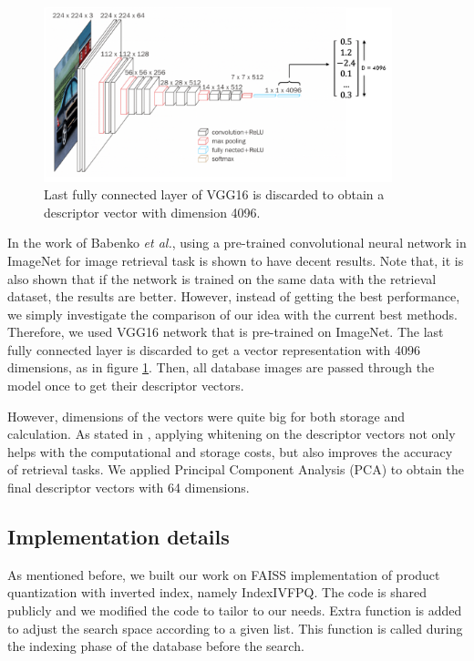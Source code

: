 \begin{figure}
    \centering
    \includegraphics[width=0.9\textwidth]{thesis/images/deep_features-fig.png}
    \caption{Last fully connected layer of VGG16\cite{simonyan2014very} is discarded to obtain a descriptor vector with dimension 4096.}
    \label{fig:vec-repr}
\end{figure}

In the work of Babenko \emph{et al.}\cite{babenko2014neural}, using a pre-trained convolutional neural network in ImageNet for image retrieval task is shown to have decent results. 
Note that, it is also shown that if the network is trained on the same data with the retrieval dataset, the results are better.
However, instead of getting the best performance, we simply investigate the comparison of our idea with the current best methods.
Therefore, we used VGG16\cite{simonyan2014very} network that is pre-trained on ImageNet\cite{deng2009imagenet}. 
The last fully connected layer is discarded to get a vector representation with 4096 dimensions, as in figure \ref{fig:vec-repr}.
Then, all database images are passed through the model once to get their descriptor vectors.

However, dimensions of the vectors were quite big for both storage and calculation. 
As stated in \cite{jegou2012negative}, applying whitening on the descriptor vectors not only helps with the computational and storage costs, but also improves the accuracy of retrieval tasks.
We applied Principal Component Analysis (PCA) to obtain the final descriptor vectors with 64 dimensions.


\subsection{Implementation details}

As mentioned before, we built our work on FAISS implementation\cite{faiss} of product quantization with inverted index, namely IndexIVFPQ. 
The code is shared publicly and we modified the code to tailor to our needs.
Extra function is added to adjust the search space according to a given list. 
This function is called during the indexing phase of the database before the search.

